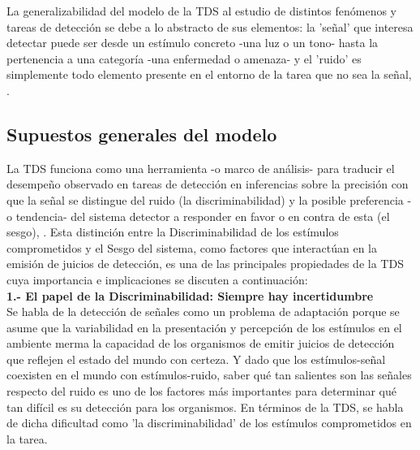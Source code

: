 La generalizabilidad del modelo de la TDS al estudio de distintos fenómenos y tareas de detección se debe a lo abstracto de sus elementos: la 'señal' que interesa detectar puede ser desde un estímulo concreto -una luz o un tono- hasta la pertenencia a una categoría -una enfermedad o amenaza- y el 'ruido' es simplemente todo elemento presente en el entorno de la tarea que no sea la señal, \parencite{Stainslaw1999, McNicol1}.\\ 

\subsection{Supuestos generales del modelo}

La TDS funciona como una herramienta -o marco de análisis- para traducir el desempeño observado en tareas de detección en inferencias sobre la precisión con que la señal se distingue del ruido (la discriminabilidad) y la posible preferencia -o tendencia- del sistema detector a responder en favor o en contra de esta (el sesgo), \parencite{McNicol1}. Esta distinción entre la Discriminabilidad de los estímulos comprometidos y el Sesgo del sistema, como factores que interactúan en la emisión de juicios de detección, es una de las principales propiedades de la TDS \parencite{Swets1961} cuya importancia e implicaciones se discuten a continuación:\\

\textbf{1.- El papel de la Discriminabilidad: Siempre hay incertidumbre}\\

Se habla de la detección de señales como un problema de adaptación porque se asume que la variabilidad en la presentación y percepción de los estímulos en el ambiente merma la capacidad de los organismos de emitir juicios de detección que reflejen el estado del mundo con certeza. Y dado que los estímulos-señal coexisten en el mundo con estímulos-ruido, saber qué tan salientes son las señales respecto del ruido es uno de los factores más importantes para determinar qué tan difícil es su detección para los organismos. En términos de la TDS, se habla de dicha dificultad como 'la discriminabilidad' de los estímulos comprometidos en la tarea.\\

